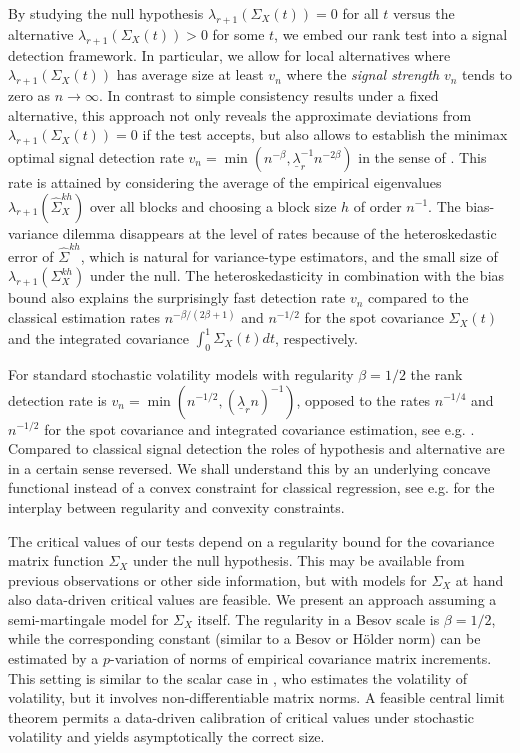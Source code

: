 \documentclass[preprint,aos]{imsart}
\numberwithin{equation}{section}
\theoremstyle{remark}
\providecommand{\mr}{\color{blue}}
\begin{document}
By studying the null hypothesis $\lambda_{r+1}(\Sigma_X(t))=0$ for all $t$ versus the alternative $\lambda_{r+1}(\Sigma_X(t))>0$ for some $t$, we embed our rank test into a signal detection framework.
 In particular, we allow for local alternatives where  $\lambda_{r+1}(\Sigma_X(t))$ has average size at least $v_n$ where the {\it signal strength} $v_n$ tends to zero as $n\to\infty$. In contrast to simple consistency results under a fixed alternative, this approach not only reveals the approximate deviations from $\lambda_{r+1}(\Sigma_X(t))=0$ if the test accepts, but also allows to establish the minimax optimal signal detection rate $v_n=\min(n^{-\beta},\underline\lambda_r^{-1}n^{-2\beta})$ in the sense of \citet{ingster2012}. This rate is
 attained by considering the average of the empirical eigenvalues $\lambda_{r+1}(\hat\Sigma_X^{kh})$ over all blocks and choosing a block size $h$ of order $n^{-1}$. The bias-variance dilemma disappears at the level of rates because of the heteroskedastic error of $\hat\Sigma^{kh}$, which is natural for variance-type estimators, and the small size of $\lambda_{r+1}(\Sigma_X^{kh})$ under the null.
 The heteroskedasticity in combination with the bias bound also explains the surprisingly fast detection rate $v_n$ compared to the classical estimation rates $n^{-\beta/(2\beta+1)}$ and $n^{-1/2}$ for the spot covariance $\Sigma_X(t)$ and the integrated covariance $\int_0^1\Sigma_X(t)dt$, respectively.

 For standard stochastic volatility models with regularity $\beta=1/2$ the rank detection rate is $v_n=\min(n^{-1/2},(\underline\lambda_rn)^{-1})$, opposed to the rates $n^{-1/4}$ and $n^{-1/2}$  for the spot covariance and integrated covariance estimation, see e.g. \citet{FanWang2008}.
Compared to classical signal detection the roles of hypothesis and alternative are in a certain sense reversed. We shall understand this by an underlying concave functional instead of a convex constraint for classical regression, see e.g. \citet{juditsky2002} for  the interplay between regularity and convexity constraints.

The critical values of our tests depend on a regularity bound for the covariance matrix function $\Sigma_X$ under the null hypothesis. This may be available from previous observations or other side information, but with models for $\Sigma_X$ at hand also data-driven critical values are feasible. We present an approach assuming a semi-martingale model for $\Sigma_X$ itself. The regularity in a Besov scale is $\beta=1/2$, while the corresponding constant (similar to a Besov or H\"older norm) can be estimated by a $p$-variation of norms of empirical covariance matrix increments. This setting is similar to the scalar case in  \cite{Vetter2015}, who estimates the volatility of volatility, but it involves non-differentiable matrix norms. A feasible central limit theorem %
permits a data-driven calibration of  critical values under stochastic volatility and yields asymptotically the correct size. %
\end{document}
